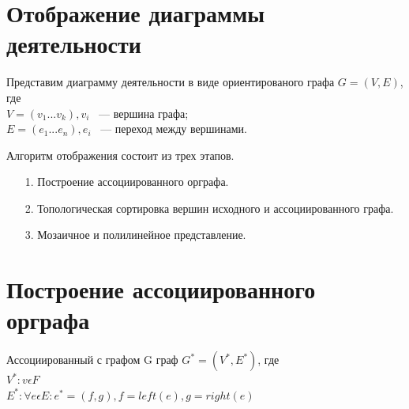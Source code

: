\documentclass[12pt]{article}
\begin{document}
\section{Отображение диаграммы деятельности }

Представим диаграмму деятельности в виде ориентированого графа $ G = (V, E) $, где \\
$ V = (v_{1} ... v_{k}), v_{i} $ ~--- вершина графа; \\
$ E = (e_{1} ... e_{n}), e_{i} $ ~--- переход между вершинами.

Алгоритм отображения состоит из трех этапов.
\begin{enumerate}
\item[1.] Построение ассоциированного орграфа.
\item[2.] Топологическая сортировка вершин исходного и ассоциированного графа.
\item[3.] Мозаичное и полилинейное представление.
\end{enumerate}

\section{Построение ассоциированного орграфа}

Ассоциированный с графом G граф $ G^{*} = (V^{*}, E^{*}) $, где \\
$ V^{*} : v \epsilon F $ \\
$ E^{*} : \forall e \epsilon E : e^{*} = (f, g), f = left(e), g = right(e) $
\end{document}

